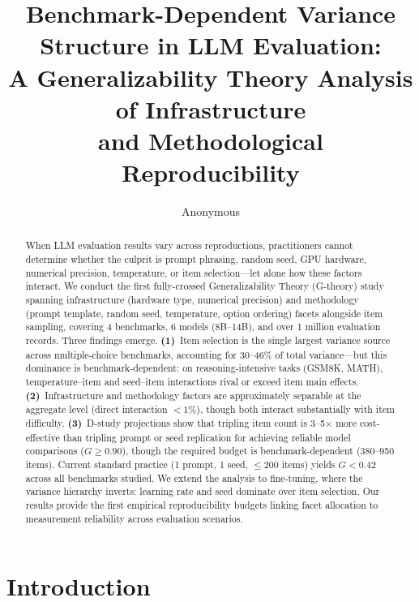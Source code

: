 \documentclass[11pt]{article}
\title{Benchmark-Dependent Variance Structure in LLM Evaluation:\\
A Generalizability Theory Analysis of Infrastructure\\
and Methodological Reproducibility}
\author{Anonymous}
\date{}
\newcommand{\gcoeff}{G}
\begin{document}
\maketitle

\begin{abstract}
When LLM evaluation results vary across reproductions, practitioners cannot determine whether the culprit is prompt phrasing, random seed, GPU hardware, numerical precision, temperature, or item selection---let alone how these factors interact.
We conduct the first fully-crossed Generalizability Theory (G-theory) study spanning infrastructure (hardware type, numerical precision) and methodology (prompt template, random seed, temperature, option ordering) facets alongside item sampling, covering 4 benchmarks, 6 models (8B--14B), and over 1 million evaluation records.
Three findings emerge.
\textbf{(1)}~Item selection is the single largest variance source across multiple-choice benchmarks, accounting for 30--46\% of total variance---but this dominance is benchmark-dependent: on reasoning-intensive tasks (GSM8K, MATH), temperature--item and seed--item interactions rival or exceed item main effects.
\textbf{(2)}~Infrastructure and methodology factors are approximately separable at the aggregate level (direct interaction $<1\%$), though both interact substantially with item difficulty.
\textbf{(3)}~D-study projections show that tripling item count is 3--5$\times$ more cost-effective than tripling prompt or seed replication for achieving reliable model comparisons ($\gcoeff \geq 0.90$), though the required budget is benchmark-dependent (380--950 items).
Current standard practice (1 prompt, 1 seed, $\leq$200 items) yields $\gcoeff < 0.42$ across all benchmarks studied.
We extend the analysis to fine-tuning, where the variance hierarchy inverts: learning rate and seed dominate over item selection.
Our results provide the first empirical reproducibility budgets linking facet allocation to measurement reliability across evaluation scenarios.
\end{abstract}

\section{Introduction}
\end{document}
